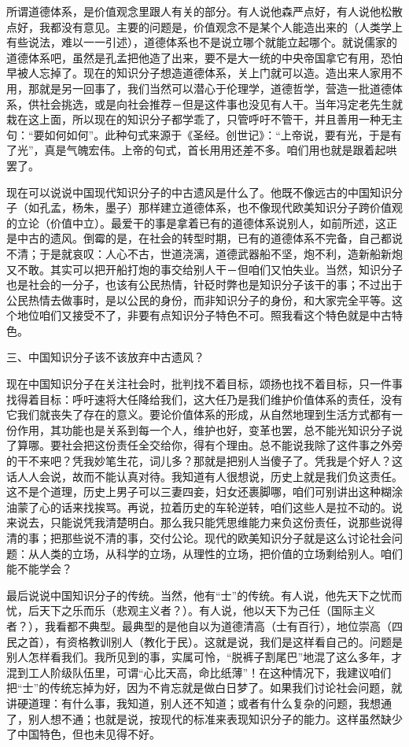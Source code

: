 所谓道德体系，是价值观念里跟人有关的部分。有人说他森严点好，有人说他松散点好，我都没有意见。主要的问题是，价值观念不是某个人能造出来的（人类学上有些说法，难以一一引述），道德体系也不是说立哪个就能立起哪个。就说儒家的道德体系吧，虽然是孔孟把他造了出来，要不是大一统的中央帝国拿它有用，恐怕早被人忘掉了。现在的知识分子想造道德体系，关上门就可以造。造出来人家用不用，那就是另一回事了，我们当然可以潜心于伦理学，道德哲学，营造一批道德体系，供社会挑选，或是向社会推荐－但是这件事也没见有人干。当年冯定老先生就栽在这上面，所以现在的知识分子都学乖了，只管呼吁不管干，并且善用一种无主句：“要如何如何”。此种句式来源于《圣经。创世记》：“上帝说，要有光，于是有了光”，真是气魄宏伟。上帝的句式，首长用用还差不多。咱们用也就是跟着起哄罢了。 

现在可以说说中国现代知识分子的中古遗风是什么了。他既不像远古的中国知识分子（如孔孟，杨朱，墨子）那样建立道德体系，也不像现代欧美知识分子跨价值观的立论（价值中立）。最爱干的事是拿着已有的道德体系说别人，如前所述，这正是中古的遗风。倒霉的是，在社会的转型时期，已有的道德体系不完备，自己都说不清；于是就哀叹：人心不古，世道浇漓，道德武器船不坚，炮不利，造新船新炮又不敢。其实可以把开船打炮的事交给别人干－但咱们又怕失业。当然，知识分子也是社会的一分子，也该有公民热情，针砭时弊也是知识分子该干的事；不过出于公民热情去做事时，是以公民的身份，而非知识分子的身份，和大家完全平等。这个地位咱们又接受不了，非要有点知识分子特色不可。照我看这个特色就是中古特色。 

三、中国知识分子该不该放弃中古遗风？ 

现在中国知识分子在关注社会时，批判找不着目标，颂扬也找不着目标，只一件事找得着目标：呼吁速将大任降给我们，这大任乃是我们维护价值体系的责任，没有它我们就丧失了存在的意义。要论价值体系的形成，从自然地理到生活方式都有一份作用，其功能也是关系到每一个人，维护也好，变革也罢，总不能光知识分子说了算哪。要社会把这份责任全交给你，得有个理由。总不能说我除了这件事之外旁的干不来吧？凭我妙笔生花，词儿多？那就是把别人当傻子了。凭我是个好人？这话人人会说，故而不能认真对待。我知道有人很想说，历史上就是我们负这责任。这不是个道理，历史上男子可以三妻四妾，妇女还裹脚哪，咱们可别讲出这种糊涂油蒙了心的话来找挨骂。再说，拉着历史的车轮逆转，咱们这些人是拉不动的。说来说去，只能说凭我清楚明白。那么我只能凭思维能力来负这份责任，说那些说得清的事；把那些说不清的事，交付公论。现代的欧美知识分子就是这么讨论社会问题：从人类的立场，从科学的立场，从理性的立场，把价值的立场剩给别人。咱们能不能学会？ 

最后说说中国知识分子的传统。当然，他有“士”的传统。有人说，他先天下之忧而忧，后天下之乐而乐（悲观主义者？）。有人说，他以天下为己任（国际主义者？），我看都不典型。最典型的是他自以为道德清高（士有百行），地位崇高（四民之首），有资格教训别人（教化于民）。这就是说，我们是这样看自己的。问题是别人怎样看我们。我所见到的事，实属可怜，“脱裤子割尾巴”地混了这么多年，才混到工人阶级队伍里，可谓“心比天高，命比纸薄”！在这种情况下，我建议咱们把“士”的传统忘掉为好，因为不肯忘就是做白日梦了。如果我们讨论社会问题，就讲硬道理：有什么事，我知道，别人还不知道；或者有什么复杂的问题，我想通了，别人想不通；也就是说，按现代的标准来表现知识分子的能力。这样虽然缺少了中国特色，但也未见得不好。

